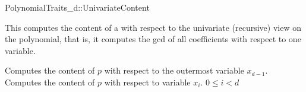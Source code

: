 \begin{ccRefConcept}{PolynomialTraits_d::UnivariateContent}

\ccDefinition

This  computes the content of a 
with respect to the univariate (recursive) view on the 
polynomial, that is, it computes the gcd of all 
coefficients  with respect to one variable. 

\ccRefines 
{}

\ccTypes

\ccGlue
{}\ccGlue

\ccOperations
{}
         {Computes the content of $p$ with respect to the outermost variable $x_{d-1}$. }
         {Computes the content of $p$ with respect to variable $x_i$. 
          \ccPrecond $0 \leq i  < d$
         }


\ccSeeAlso

\\

\end{ccRefConcept}
